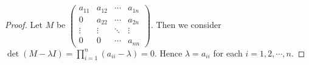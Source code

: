 \begin{Exercise}
	\begin{proof}
		Let $M$ be $\begin{pmatrix}
		a_{1 1} & a_{1 2} & \cdots & a_{1 n} \\
		0 & a_{2 2} & \cdots & a_{2 n} \\
		\vdots & \vdots & \ddots & \vdots \\
		0 & 0 & \cdots & a_{n n}
		\end{pmatrix}$. Then we consider $\det(M-\lambda I) = \prod_{i=1}^{n} (a_{i i} - \lambda) = 0$. Hence $\lambda = a_{i i}$ for each $i=1,2,\cdots,n$.
	\end{proof}
\end{Exercise}